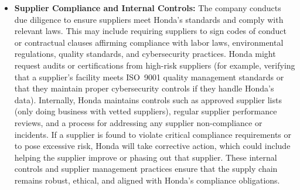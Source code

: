 \begin{itemize}
    \item \textbf{Supplier Compliance and Internal Controls:} The company conducts due diligence to ensure suppliers meet Honda’s standards and comply with relevant laws. This may include requiring suppliers to sign codes of conduct or contractual clauses affirming compliance with labor laws, environmental regulations, quality standards, and cybersecurity practices. Honda might request audits or certifications from high-risk suppliers (for example, verifying that a supplier’s facility meets ISO~9001 quality management standards or that they maintain proper cybersecurity controls if they handle Honda’s data). Internally, Honda maintains controls such as approved supplier lists (only doing business with vetted suppliers), regular supplier performance reviews, and a process for addressing any supplier non-compliance or incidents. If a supplier is found to violate critical compliance requirements or to pose excessive risk, Honda will take corrective action, which could include helping the supplier improve or phasing out that supplier. These internal controls and supplier management practices ensure that the supply chain remains robust, ethical, and aligned with Honda’s compliance obligations.
\end{itemize}


